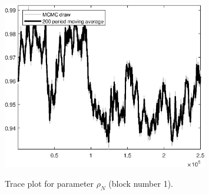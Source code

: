 \begin{figure}[H]
\centering
  \includegraphics[width=0.8\textwidth]{BRS_comovement/graphs/TracePlot_rho_N_blck_1}\\
    \caption{Trace plot for parameter ${\rho_N}$ (block number 1).}
\end{figure}
